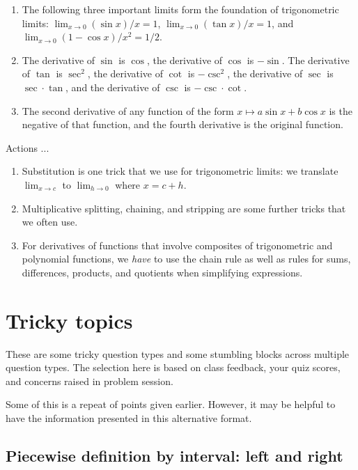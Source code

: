 \documentclass[10pt]{amsart}
\begin{document}
\begin{enumerate}
\item The following three important limits form the foundation of
  trigonometric limits: $\lim_{x \to 0} (\sin x)/x = 1$, $\lim_{x \to
  0} (\tan x)/x = 1$, and $\lim_{x \to 0} (1 - \cos x)/x^2 = 1/2$.
\item The derivative of $\sin$ is $\cos$, the derivative of $\cos$ is
  $-\sin$. The derivative of $\tan$ is $\sec^2$, the derivative of
  $\cot$ is $-\csc^2$, the derivative of $\sec$ is $\sec \cdot \tan$,
  and the derivative of $\csc$ is $-\csc \cdot \cot$.
\item The second derivative of any function of the form $x \mapsto
  a\sin x + b \cos x$ is the negative of that function, and the fourth
  derivative is the original function.
\end{enumerate}

Actions ...

\begin{enumerate}
\item Substitution is one trick that we use for trigonometric limits:
  we translate $\lim_{x \to c}$ to $\lim_{h \to 0}$ where $x = c + h$.
\item Multiplicative splitting, chaining, and stripping are some
  further tricks that we often use.
\item For derivatives of functions that involve composites of
  trigonometric and polynomial functions, we {\em have} to use the
  chain rule as well as rules for sums, differences, products, and
  quotients when simplifying expressions.
\end{enumerate}

\section{Tricky topics}

These are some tricky question types and some stumbling blocks across
multiple question types. The selection here is based on class
feedback, your quiz scores, and concerns raised in problem session.

Some of this is a repeat of points given earlier. However, it may be
helpful to have the information presented in this alternative format.

\subsection{Piecewise definition by interval: left and right}
\end{document}

